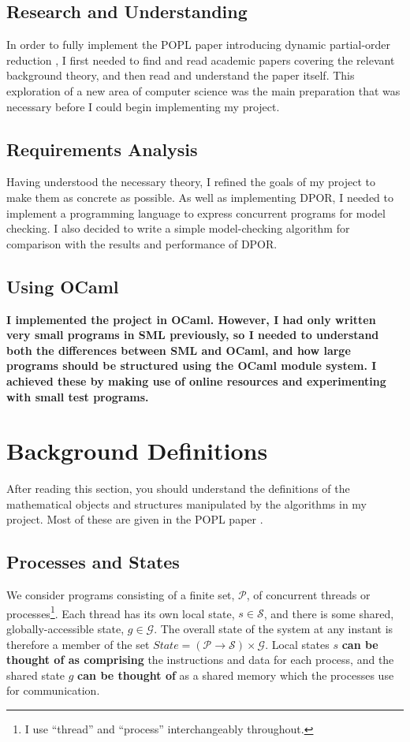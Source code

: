 \documentclass[12pt,a4paper,twoside,openright]{report}
\begin{document}
\subsection{Research and Understanding}

In order to fully implement the
POPL paper introducing dynamic partial-order
reduction \cite{flan05}, I first needed
to find and read academic papers
covering the relevant
background theory, and then
read and understand the paper itself.
This exploration
of a new area of computer science was the
main preparation that was necessary
before I could begin implementing
my project.

\subsection{Requirements Analysis}
Having understood the necessary theory,
I refined the goals of my project to
make them as concrete as possible.
As well as implementing DPOR,
I needed to implement
a programming language
to express concurrent programs
for model checking. I also decided
to write a simple model-checking
algorithm for comparison with
the results and performance of DPOR.

\subsection{Using OCaml}
\textbf{I implemented the project in OCaml.
However, I had only written very small
programs in SML previously, so I needed to
understand both the differences between
SML and OCaml, and how large programs
should be structured
using the OCaml module system.
I achieved these
by making use of online resources and
experimenting with small test programs.}

\section{Background Definitions} \label{sec:background-defs}
After reading this section, you should understand the
definitions of the mathematical objects and structures
manipulated by the algorithms in my project. Most
of these are given in the POPL paper \cite{flan05}.

\subsection{Processes and States}
We consider programs consisting of a finite set, $\mathcal{P}$,
of concurrent threads or processes\footnote{I use ``thread'' and
``process'' interchangeably throughout.}.
Each thread has its own local state, $s \in \mathcal{S}$, and there
is some shared, globally-accessible state, $g \in \mathcal{G}$. The overall
state of the system at any instant is therefore a member of the set
$ \textit{State} = (\mathcal{P} \to \mathcal{S}) \times \mathcal{G} $.
Local states $s$ \textbf{can be thought of as comprising} the instructions
and data for each process, and the shared state $g$ \textbf{can be thought
of} as a shared memory which the processes use for communication.
\end{document}
